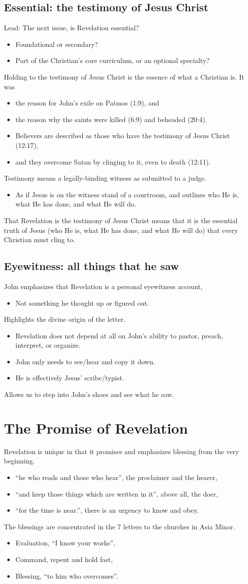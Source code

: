 \documentclass[12pt]{article}
\newcommand{\BI}{\begin{itemize}}
\newcommand{\EI}{\end{itemize}}
\newcommand{\I}{\item}
\begin{document}
\subsection{Essential: the testimony of Jesus Christ}
\I  Lead: The next issue, is Revelation essential?
\BI \I Foundational or secondary?
    \I Part of the Christian's core curriculum, or an optional specialty?
\EI
\I  Holding to the testimony of Jesus Christ is the essence of what a Christian is. It was 
\BI \I  the reason for John's exile on Patmos (1:9), and
    \I  the reason why the saints were killed (6:9) and beheaded (20:4).
    \I  Believers are described as those who have the testimony of Jesus Christ (12:17),
    \I  and they overcome Satan by clinging to it, even to death (12:11).
\EI
\I  Testimony means a legally-binding witness as submitted to a judge.
\BI \I  As if Jesus is on the witness stand of a courtroom, and outlines 
        who He is, what He has done, and what He will do. \EI
\I  That Revelation is the testimony of Jesus Christ means that it is the essential truth of Jesus 
    (who He is, what He has done, and what He will do)
    that every Christian must cling to.

\subsection{Eyewitness: all things that he saw}
\I  John emphasizes that Revelation is a personal eyewitness account,
\BI \I  Not something he thought up or figured out. \EI
\I  Highlights the divine origin of the letter.
\BI \I  Revelation does not depend at all on John's ability to pastor, preach, interpret, or organize.
    \I  John only needs to see/hear and copy it down.
    \I  He is effectively Jesus' scribe/typist.
\EI
\I  Allows us to step into John's shoes and see what he saw.

\section{The Promise of Revelation}
\I  Revelation is unique in that it promises and emphasizes blessing from the very beginning.
\BI \I  ``he who reads and those who hear'', the proclaimer and the hearer,
    \I  ``and keep those things which are written in it'', above all, the doer,
    \I  ``for the time is near.'', there is an urgency to know and obey. \EI
\I  The blessings are concentrated in the 7 letters to the churches in Asia Minor.
\BI \I  Evaluation, ``I know your works'',
    \I  Command, repent and hold fast,
    \I  Blessing, ``to him who overcomes''. \EI
\end{document}
